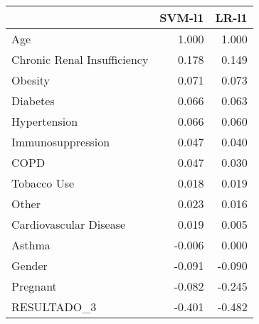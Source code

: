 \begin{tabular}{lrr}
\toprule
{} &  SVM-l1 &  LR-l1 \\
\midrule
Age                         &   1.000 &  1.000 \\
Chronic Renal Insufficiency &   0.178 &  0.149 \\
Obesity                     &   0.071 &  0.073 \\
Diabetes                    &   0.066 &  0.063 \\
Hypertension                &   0.066 &  0.060 \\
Immunosuppression           &   0.047 &  0.040 \\
COPD                        &   0.047 &  0.030 \\
Tobacco Use                 &   0.018 &  0.019 \\
Other                       &   0.023 &  0.016 \\
Cardiovascular Disease      &   0.019 &  0.005 \\
Asthma                      &  -0.006 &  0.000 \\
Gender                      &  -0.091 & -0.090 \\
Pregnant                    &  -0.082 & -0.245 \\
RESULTADO\_3                 &  -0.401 & -0.482 \\
\bottomrule
\end{tabular}
